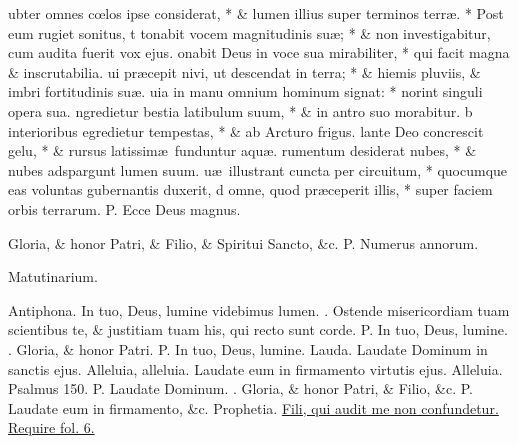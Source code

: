 \documentclass[letter,11pt]{book}
\makeatletter
\DeclareRobustCommand{\Vbar}{\vers@resp{-0.1em}{V}}
\newcommand{\vers@resp@sym}{\raisebox{0.2ex}{\rotatebox[origin=c]{-20}{$\m@th\rceil$}}}
\newcommand{\vers@resp}[2]{%
  {\ooalign{\hidewidth\kern#1\vers@resp@sym\hidewidth\cr#2\cr}}%
}%
\def\P{\color{Red} P. \color{black}}
\def\V{\color{Red} \Vbar . \color{black}}
\makeatother
\begin{document}
\begin{multicols}{2}
ubter omnes c\oe los ipse considerat, * \& lumen illius super terminos terr\ae . * Post eum rugiet sonitus,
t tonabit vocem magnitudinis su\ae ; * \& non investigabitur, cum audita fuerit vox ejus.
onabit Deus in voce sua mirabiliter, * qui facit magna \& inscrutabilia.
ui pr\ae cepit nivi, ut descendat in terra; * \& hiemis pluviis, \& imbri fortitudinis su\ae .
uia in manu omnium hominum signat: * norint singuli opera sua.
ngredietur bestia latibulum suum, * \& in antro suo morabitur.
b interioribus egredietur tempestas, * \& ab Arcturo frigus.
lante Deo concrescit gelu, * \& rursus latissim\ae \ funduntur aqu\ae .
rumentum desiderat nubes, * \& nubes adspargunt lumen suum.
u\ae \ illustrant cuncta per circuitum, * quocumque eas voluntas gubernantis duxerit,
d omne, quod pr\ae ceperit illis, * super faciem orbis terrarum.
\newline \P Ecce Deus magnus.
\par Gloria, \& honor Patri, \& Filio, \& Spiritui Sancto, \&c. \P Numerus annorum.
\vspace{-.75em} \begin{center} \color{Red} Matutinarium. \end{center} \vspace{-.75em}
\noindent \color{Red} Antiphona. \color{black} In tuo, Deus, lumine videbimus lumen. \V Ostende misericordiam tuam scientibus te, \& justitiam tuam his, qui recto sunt corde. \P In tuo, Deus, lumine. \V Gloria, \& honor Patri. \P In tuo, Deus, lumine.
\newline \color{Red} Lauda. \color{black} Laudate Dominum in sanctis ejus. Alleluia, alleluia. Laudate eum in firmamento virtutis ejus. Alleluia. \color{Red} Psalmus 150. \color{black} \P Laudate Dominum. \V Gloria, \& honor Patri, \& Filio, \&c. \P Laudate eum in firmamento, \&c. \color{Red} Prophetia. \color{black} \hyperlink{sirach.24}{Fili, qui audit me non confundetur. {\color{Red} Require fol.} 6.}

\end{multicols}
\end{document}
